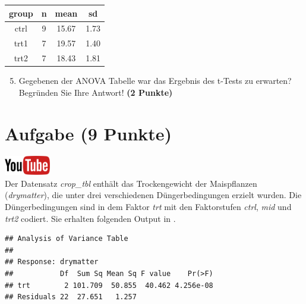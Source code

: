 \documentclass[a4paper, 10pt]{scrartcl}\usepackage[]{graphicx}\usepackage[]{xcolor}
\makeatletter
\newenvironment{kframe}{%
 \def\at@end@of@kframe{}%
 \ifinner\ifhmode%
  \def\at@end@of@kframe{\end{minipage}}%
  \begin{minipage}{\columnwidth}%
 \fi\fi%
 \def\FrameCommand##1{\hskip\@totalleftmargin \hskip-\fboxsep
 \colorbox{shadecolor}{##1}\hskip-\fboxsep
     \hskip-\linewidth \hskip-\@totalleftmargin \hskip\columnwidth}%
 \MakeFramed {\advance\hsize-\width
   \@totalleftmargin\z@ \linewidth\hsize
   \@setminipage}}%
 {\par\unskip\endMakeFramed%
 \at@end@of@kframe}
\newenvironment{knitrout}{}{} %
\makeatother
\begin{document}
\begin{knitrout}
\color{fgcolor}\begin{table}[!h]
\centering
\begin{tabular}{cccc}
\toprule
group & n & mean & sd\\
\midrule
ctrl & 9 & 15.67 & 1.73\\
trt1 & 7 & 19.57 & 1.40\\
trt2 & 7 & 18.43 & 1.81\\
\bottomrule
\end{tabular}
\end{table}

\end{knitrout}

\begin{enumerate}
  \setcounter{enumi}{4}
\item Gegebenen der ANOVA Tabelle war das Ergebnis des t-Tests zu erwarten?
  Begr{\"u}nden Sie Ihre Antwort! \textbf{(2 Punkte)}
\end{enumerate}

 
\clearpage

\section{Aufgabe \hfill (9 Punkte)}

\hfill\href{https://youtu.be/d4CFR2MKX7I}{\includegraphics[width =
  2cm]{img/youtube}}\\[1Ex]

Der Datensatz \textit{crop\_tbl} enth{\"a}lt das Trockengewicht der
Maispflanzen (\textit{drymatter}), die unter drei 
verschiedenen D{\"u}ngerbedingungen erzielt wurden. Die D{\"u}ngerbedingungen sind in dem Faktor
\textit{trt} mit den Faktorstufen \textit{ctrl},  \textit{mid} und
 \textit{trt2} codiert. Sie erhalten folgenden Output in \Rlogo.

\begin{knitrout}
\color{fgcolor}\begin{kframe}
\begin{verbatim}
## Analysis of Variance Table
## 
## Response: drymatter
##           Df  Sum Sq Mean Sq F value    Pr(>F)
## trt        2 101.709  50.855  40.462 4.256e-08
## Residuals 22  27.651   1.257
\end{verbatim}
\end{kframe}
\end{knitrout}
\end{document}
